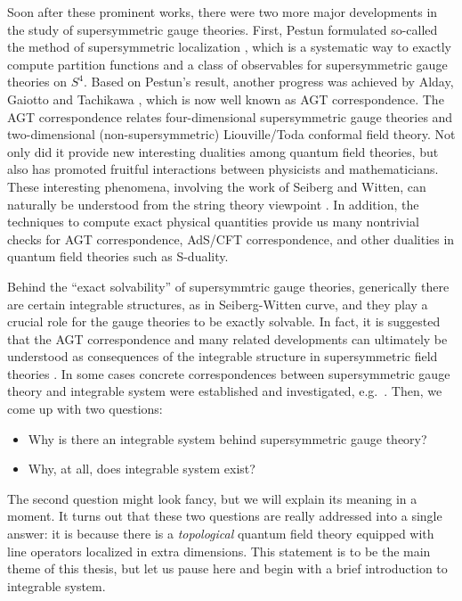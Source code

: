 Soon after these prominent works, there were two more major developments in the study of
supersymmetric gauge theories.
First, Pestun formulated so-called the method of supersymmetric localization \cite{Pestun:2007rz},
which is a systematic way to exactly compute partition functions and a class of observables
for supersymmetric gauge theories on $S^4$.
Based on Pestun's result, another progress was achieved by
Alday, Gaiotto and Tachikawa \cite{Alday:2009aq}, which
is now well known as AGT correspondence.
The AGT correspondence relates four-dimensional supersymmetric gauge theories and
two-dimensional (non-supersymmetric) Liouville/Toda conformal field theory.
Not only did it provide new interesting dualities among quantum field theories,
but also has promoted fruitful interactions between physicists and mathematicians.
These interesting phenomena, involving the work of Seiberg and Witten,
can naturally be understood from the string theory viewpoint \cite{Witten:1997sc,Gaiotto:2009we}.
In addition, the techniques to compute exact physical quantities provide us many nontrivial checks
for AGT correspondence, AdS/CFT correspondence,
and other dualities in quantum field theories such as S-duality.


Behind the ``exact solvability'' of supersymmtric gauge theories, generically there are certain integrable
structures, as in Seiberg-Witten curve, and they play a crucial role for the gauge theories to be
exactly solvable.
In fact, it is suggested that the AGT correspondence and many related developments can ultimately
be understood as consequences of the integrable structure in
supersymmetric field theories \cite{Gaiotto:2009hg,Teschner:2010je}.
In some cases concrete correspondences between
supersymmetric gauge theory and integrable system were established and investigated,
e.g.~\cite{Nekrasov:2009uh,Nekrasov:2009ui,Nekrasov:2009rc,Nekrasov:2010ka,Nekrasov:2011bc,Yamazaki:2012cp,Terashima:2012cx,Yamazaki:2013nra,Nekrasov:2015wsu}.
Then, we come up with two questions:
\begin{itemize}
    \item Why is there an integrable system behind supersymmetric gauge theory?
    \item Why, at all, does integrable system exist?
\end{itemize}
The second question might look fancy, but we will explain its meaning in a moment.
It turns out that these two questions are really addressed into a single answer:
it is because there is a \emph{topological} quantum field theory
equipped with line operators localized in extra dimensions.
This statement is to be the main theme of this thesis, but let us pause here and
begin with a brief introduction
to integrable system.


